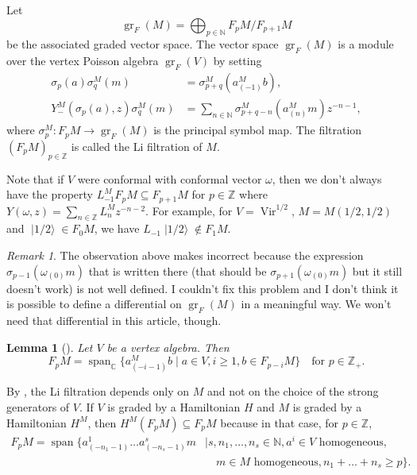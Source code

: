 \documentclass[a4paper, 12pt, reqno]{amsart}
\newtheorem{lemma}[theorem]{Lemma}
\theoremstyle{remark}
\newtheorem{remark}[theorem]{Remark}
\numberwithin{equation}{subsection}
\DeclareMathOperator{\Vir}{Vir}
\DeclareMathOperator{\gr}{gr}
\DeclareMathOperator{\vspan}{span}
\DeclareMathOperator{\vachalf}{|1/2\rangle}
\begin{document}
Let
\begin{equation*}
  \gr_F(M) = \bigoplus_{p \in \mathbb{N}}F_pM/F_{p + 1}M
\end{equation*}
be the associated graded vector space.
The vector space $\gr_F(M)$ is a module over the vertex Poisson algebra $\gr_F(V)$ by setting
\begin{align*}
  \sigma_p(a)\sigma^M_q(m) &= \sigma^M_{p + q}(a^M_{(-1)}b), \\
  Y^M_-(\sigma_p(a), z)\sigma^M_q(m) &= \sum_{n \in \mathbb{N}}\sigma^M_{p + q - n}(a^M_{(n)}m)z^{-n - 1},
\end{align*}
where $\sigma^M_p: F_pM \to \gr_F(M)$ is the principal symbol map.
The filtration $(F_pM)_{p \in \mathbb{Z}}$ is called the Li filtration of $M$.

Note that if $V$ were conformal with conformal vector $\omega$, then we don't always have the property $L_{-1}^MF_pM \subseteq F_{p + 1}M$ for $p \in \mathbb{Z}$ where $Y(\omega, z) = \sum_{n \in \mathbb{Z}}L^M_nz^{-n - 2}$.
For example, for $V = \Vir^{1/2}$, $M = M(1/2, 1/2)$ and $\vachalf \in F_0M$, we have $L_{-1}\vachalf \notin F_1M$.

\begin{remark}
  \label{rmk:28}
  The observation above makes \cite[Lemma 3.1.2]{arakawa_remark_2012} incorrect because the expression $\sigma_{p - 1}(\omega_{(0)}m)$ that is written there (that should be $\sigma_{p + 1}(\omega_{(0)}m)$ but it still doesn't work) is not well defined.
  I couldn't fix this problem and I don't think it is possible to define a differential on $\gr_F(M)$ in a meaningful way.
  We won't need that differential in this article, though.
\end{remark}

\begin{lemma}[{\cite[Lemma 2.9]{li_abelianizing_2005}}]
  \label{lmm:18}
  Let $V$ be a vertex algebra.
  Then
  \begin{equation*}
    F_pM = \vspan_{\mathbb{C}}\{a^M_{(-i - 1)}b \mid a \in V, i \ge 1, b \in F_{p - i}M\} \quad \text{for }p \in \mathbb{Z}_+.
  \end{equation*}
\end{lemma}

By , the Li filtration depends only on $M$ and not on the choice of the strong generators of $V$.
If $V$ is graded by a Hamiltonian $H$ and $M$ is graded by a Hamiltonian $H^M$, then $H^M(F_pM) \subseteq F_pM$ because in that case, for $p \in \mathbb{Z}$,
\begin{equation*}
  \begin{split}
    F_pM =\vspan \{a^1_{(-n_1 - 1)}\dots a^s_{(-n_s - 1)}m &\mid s, n_1, \dots, n_s \in \mathbb{N}, a^i \in V\text{ homogeneous},\\
    &\quad  m\in M\text{ homogeneous}, n_1 + \dots + n_s \ge p\}.
  \end{split}
\end{equation*}
\end{document}
